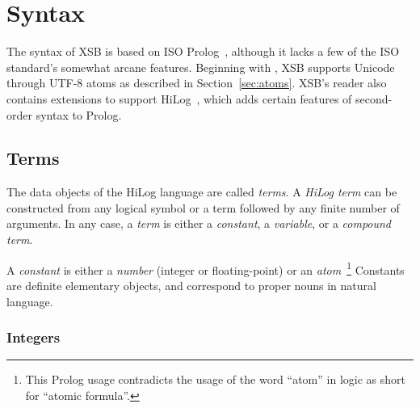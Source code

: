 \chapter{Syntax} \label{Syntax}

The syntax of XSB is based on ISO Prolog~\cite{ISO-Prolog}, although
it lacks a few of the ISO standard's somewhat arcane features.
Beginning with \version, XSB supports Unicode through UTF-8 atoms as
described in Section~\ref{sec:atoms}.  XSB's reader also contains extensions to
support HiLog~\cite{ChKW93}, which adds certain features of
second-order syntax to Prolog.

\section{Terms} \label{TermSyntax}
The data objects of the HiLog language are called {\em terms}.
A {\em HiLog term} can be constructed from any logical symbol or a term
followed by any finite number of arguments.  In any case, a {\em term}
is either a {\em constant}, a {\em variable}, or a {\em compound term}.

A {\em constant} is either a {\em number} (integer or floating-point)
or an {\em atom}~\footnote{This Prolog usage contradicts the usage of
  the word ``atom'' in logic as short for ``atomic formula''.}  Constants
are definite elementary objects, and correspond to proper nouns in
natural language.

\subsection{Integers}
